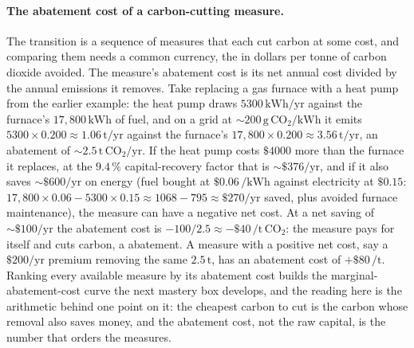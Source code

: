 \paragraph{The abatement cost of a carbon-cutting measure.} The transition is a
sequence of measures that each cut carbon at some cost, and comparing them
needs a common currency, the  in dollars per tonne
of carbon dioxide avoided. The measure's abatement cost is its net annual cost
divided by the annual emissions it removes. Take replacing a gas furnace with a
heat pump from the earlier example: the heat pump draws $5300\,\si{\kilo\watt
\hour}/\text{yr}$ against the furnace's $17{,}800\,\si{\kilo\watt\hour}$ of
fuel, and on a grid at $\sim 200\,\si{\gram}\,\text{CO}_2/\si{\kilo\watt\hour}$
it emits $5300\times 0.200 \approx 1.06\,\text{t}/\text{yr}$ against the
furnace's $17{,}800\times 0.200 \approx 3.56\,\text{t}/\text{yr}$, an
abatement of $\sim 2.5\,\text{t}\,\text{CO}_2/\text{yr}$. If the heat pump
costs $\$4000$ more than the furnace it replaces, at the $9.4\,\%$
capital-recovery factor that is $\sim \$376/\text{yr}$, and if it also saves
$\sim \$600/\text{yr}$ on energy (fuel bought at $\$0.06\,\si{\per\kilo\watt
\hour}$ against electricity at $\$0.15$: $17{,}800\times 0.06 - 5300\times 0.15
\approx 1068 - 795 \approx \$270/\text{yr}$ saved, plus avoided furnace
maintenance), the measure can have a negative net cost. At a net saving of
$\sim \$100/\text{yr}$ the abatement cost is $-100/2.5 \approx -\$40\,
\text{/t}\,\text{CO}_2$: the measure pays for itself and cuts carbon, a
 abatement. A measure with a positive net cost, say a
$\$200/\text{yr}$ premium removing the same $2.5\,\text{t}$, has an abatement
cost of $+\$80\,\text{/t}$. Ranking every available measure by its
abatement cost builds the marginal-abatement-cost curve the next mastery box
develops, and the reading here is the arithmetic behind one point on it: the
cheapest carbon to cut is the carbon whose removal also saves money, and the
abatement cost, not the raw capital, is the number that orders the measures.









